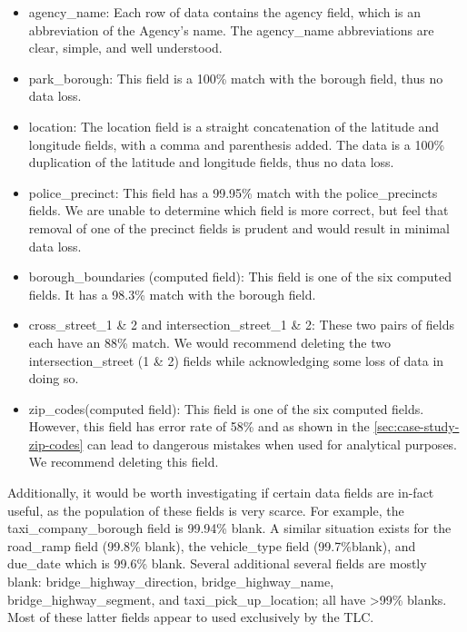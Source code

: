 \documentclass[linenumber]{jdsart}
\begin{document}
 
\begin{itemize}
	\item agency\_name: Each row of data contains the agency field, 
	which is an abbreviation of the Agency's name. The agency\_name 
	abbreviations are clear, simple, and well understood.
		    
	\item park\_borough:  This field is a 100\% match with the 
	borough field, thus no data loss. 
		    
	\item location:  The location field is a straight concatenation of 
	the latitude and longitude fields, with a comma and parenthesis 
	added. The data is a 100\% duplication of the latitude 
	and longitude fields, thus no data loss.
		    
	\item police\_precinct: This field has a 99.95\% match with the 
	police\_precincts fields. We are unable to determine which field 
	is more correct, but feel that removal of one of the precinct fields 
	is prudent and would result in minimal data loss.
		   
	\item borough\_boundaries (computed field): This field is one of 
	the six computed fields. It has a 98.3\% match with the borough 
	field.
		    
	\item cross\_street\_1 \& 2 and intersection\_street\_1 \& 2: These 
	two pairs of fields each have an 88\% match. We would recommend 
	deleting the two intersection\_street (1 \& 2) fields while acknowledging 
	some loss of data in doing so.
		     
	\item zip\_codes(computed field):  This field is one of the six 
	computed fields. However, this field has error rate of 58\% and 
	as shown in the \ref{sec:case-study-zip-codes} can lead to 
	dangerous mistakes when used for analytical purposes. We 
	recommend deleting this field.
\end{itemize}
 	
 	
Additionally, it would be worth investigating if certain data fields are 
in-fact useful, as the population of these fields is very scarce. For 
example, the taxi\_company\_borough field is 99.94\% 
blank. A similar situation exists for the road\_ramp field 
(99.8\% blank), the vehicle\_type field (99.7\%blank), and 
due\_date which is 99.6\% blank. Several additional several fields
are mostly blank: bridge\_highway\_direction, bridge\_highway\_name, 
bridge\_highway\_segment, and taxi\_pick\_up\_location; all 
have \textgreater99\% blanks. Most of these latter fields 
appear to used exclusively by the TLC.  
\end{document}
